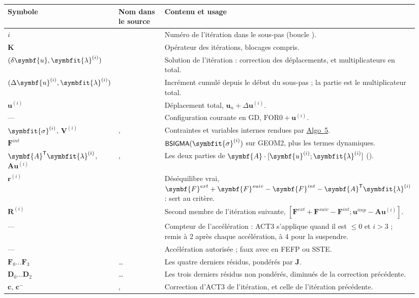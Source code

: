 \documentclass[11pt,a4paper]{article}
\makeatletter
\numberwithin{equation}{section}
\newcommand{\src}[1]{\texttt{\detokenize{#1}}}          %
\newcommand{\op}[1]{\textsf{\small #1}}                 %
\newcommand{\vc}[1]{\symbf{#1}}                         %
\newcommand{\sig}{\symbfit{\sigma}}
\newcommand{\vg}[1]{\symbfit{#1}}                       %
\newcommand{\algoref}[1]{\hyperref[algo:#1]{Algo~#1}}
\newenvironment{glossaire}[1][Glossaire]{%
  \par\smallskip\needspace{7\baselineskip}\noindent{\sffamily\bfseries\small #1}\par\nopagebreak
  \small
  \renewcommand{\arraystretch}{1.18}
  \begin{longtable}{@{}>{\raggedright\arraybackslash}p{0.17\linewidth}
                     >{\raggedright\arraybackslash}p{0.22\linewidth}
                     >{\raggedright\arraybackslash}p{0.555\linewidth}@{}}
  \toprule
  \textbf{Symbole} & \textbf{Nom dans le source} & \textbf{Contenu et usage}\\
  \midrule\endhead
  \bottomrule\endfoot}
  {\end{longtable}\addtocounter{table}{-1}\normalsize\vspace{-0.4em}}
\makeatother
\begin{document}
\begin{glossaire}
$i$ & \src{IT} & Numéro de l'itération dans le sous-pas (boucle \src{ETIQ}).\\
$\vc K$ & \src{ZRAID} & Opérateur des itérations, blocages compris.\\
$(\delta\vc u, \vg\lambda^{(i)})$ & \src{ZDEP1} & Solution de l'itération : correction des déplacements, et multiplicateurs en total.\\
$(\Delta\vc u^{(i)}, \vg\lambda^{(i)})$ & \src{ZDEPT} & Incrément cumulé depuis le début du sous-pas ; la partie \src{LX} est le multiplicateur total.\\
$\vc u^{(i)}$ & \src{ZDETOT} & Déplacement total, $\vc u_n + \Delta\vc u^{(i)}$.\\
— & \src{GEOM2} & Configuration courante en GD, $\mathrm{FOR0} + \vc u^{(i)}$.\\
$\sig^{(i)}$, $\vc V^{(i)}$ & \src{ZSIGF}, \src{ZVARF} & Contraintes et variables internes rendues par \algoref{5}.\\
$\vc F^{int}$ & \src{FEQU2} & $\op{BSIGMA}(\sig^{(i)})$ sur GEOM2, plus les termes dynamiques.\\
$\vc A^{\mathsf T}\vg\lambda^{(i)}$, $\vc A\vc u^{(i)}$ & \src{FCORF}, \src{FCORU} & Les deux parties de $\vc A\cdot[\vc u^{(i)} ; \vg\lambda^{(i)}]$ (\src{ZCLIM * ZDETOT}).\\
$\vc r^{(i)}$ & \src{RESIDC} & Déséquilibre vrai, $\vc F^{ext} + \vc F^{suiv} - \vc F^{int} - \vc A^{\mathsf T}\vg\lambda^{(i)}$ : sert au critère.\\
$\vc R^{(i)}$ & \src{RESIDU} & Second membre de l'itération suivante, $[\vc F^{ext} + \vc F^{suiv} - \vc F^{int} ; \vc u^{imp} - \vc A\vc u^{(i)}]$.\\
— & \src{ITACC} & Compteur de l'accélération : \op{ACT3} s'applique quand il est $\le 0$ et $i > 3$ ; remis à 2 après chaque accélération, à 4 pour la suspendre.\\
— & \src{ZNACCE} & Accélération autorisée ; faux avec \src{K_TANGENT} en FEFP ou SSTE.\\
$\vc F_0 \dots \vc F_3$ & \src{ACFP0} … \src{ACFP3} & Les quatre derniers résidus, pondérés par $\vc J$.\\
$\vc D_0 \dots \vc D_2$ & \src{ACFEP0} … \src{ACFEP2} & Les trois derniers résidus non pondérés, diminués de la correction précédente.\\
$\vc c$, $\vc c^{-}$ & \src{CORREC}, \src{CORRECA} & Correction d'\op{ACT3} de l'itération, et celle de l'itération précédente.\\

\end{glossaire}
\end{document}
